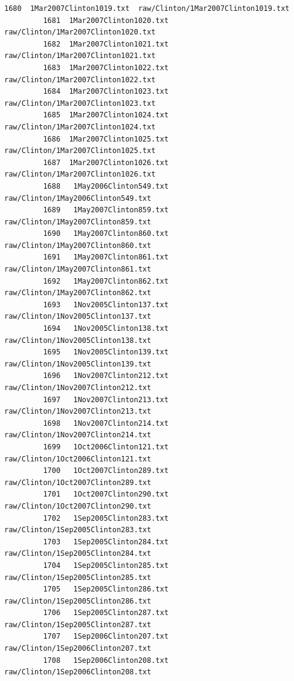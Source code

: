 \documentclass[11pt]{article}
\begin{document}
\begin{Verbatim}[commandchars=\\\{\}]
         1680  1Mar2007Clinton1019.txt  raw/Clinton/1Mar2007Clinton1019.txt   
         1681  1Mar2007Clinton1020.txt  raw/Clinton/1Mar2007Clinton1020.txt   
         1682  1Mar2007Clinton1021.txt  raw/Clinton/1Mar2007Clinton1021.txt   
         1683  1Mar2007Clinton1022.txt  raw/Clinton/1Mar2007Clinton1022.txt   
         1684  1Mar2007Clinton1023.txt  raw/Clinton/1Mar2007Clinton1023.txt   
         1685  1Mar2007Clinton1024.txt  raw/Clinton/1Mar2007Clinton1024.txt   
         1686  1Mar2007Clinton1025.txt  raw/Clinton/1Mar2007Clinton1025.txt   
         1687  1Mar2007Clinton1026.txt  raw/Clinton/1Mar2007Clinton1026.txt   
         1688   1May2006Clinton549.txt   raw/Clinton/1May2006Clinton549.txt   
         1689   1May2007Clinton859.txt   raw/Clinton/1May2007Clinton859.txt   
         1690   1May2007Clinton860.txt   raw/Clinton/1May2007Clinton860.txt   
         1691   1May2007Clinton861.txt   raw/Clinton/1May2007Clinton861.txt   
         1692   1May2007Clinton862.txt   raw/Clinton/1May2007Clinton862.txt   
         1693   1Nov2005Clinton137.txt   raw/Clinton/1Nov2005Clinton137.txt   
         1694   1Nov2005Clinton138.txt   raw/Clinton/1Nov2005Clinton138.txt   
         1695   1Nov2005Clinton139.txt   raw/Clinton/1Nov2005Clinton139.txt   
         1696   1Nov2007Clinton212.txt   raw/Clinton/1Nov2007Clinton212.txt   
         1697   1Nov2007Clinton213.txt   raw/Clinton/1Nov2007Clinton213.txt   
         1698   1Nov2007Clinton214.txt   raw/Clinton/1Nov2007Clinton214.txt   
         1699   1Oct2006Clinton121.txt   raw/Clinton/1Oct2006Clinton121.txt   
         1700   1Oct2007Clinton289.txt   raw/Clinton/1Oct2007Clinton289.txt   
         1701   1Oct2007Clinton290.txt   raw/Clinton/1Oct2007Clinton290.txt   
         1702   1Sep2005Clinton283.txt   raw/Clinton/1Sep2005Clinton283.txt   
         1703   1Sep2005Clinton284.txt   raw/Clinton/1Sep2005Clinton284.txt   
         1704   1Sep2005Clinton285.txt   raw/Clinton/1Sep2005Clinton285.txt   
         1705   1Sep2005Clinton286.txt   raw/Clinton/1Sep2005Clinton286.txt   
         1706   1Sep2005Clinton287.txt   raw/Clinton/1Sep2005Clinton287.txt   
         1707   1Sep2006Clinton207.txt   raw/Clinton/1Sep2006Clinton207.txt   
         1708   1Sep2006Clinton208.txt   raw/Clinton/1Sep2006Clinton208.txt   
         

\end{Verbatim}
\end{document}
